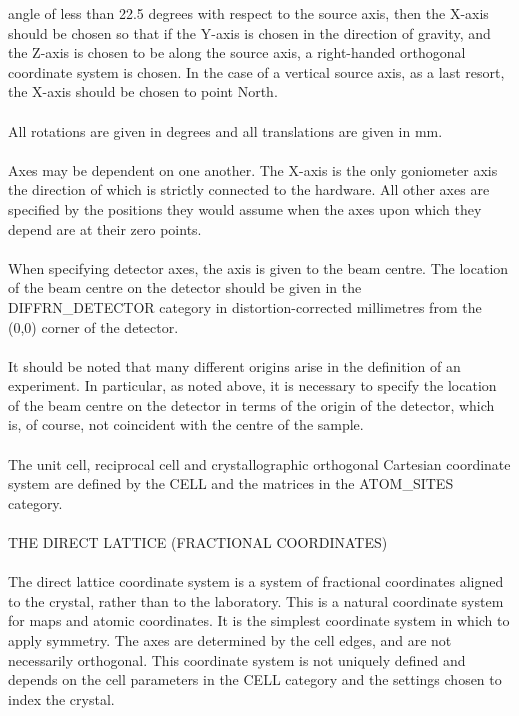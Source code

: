\documentclass[11pt]{article}
\begin{document}
{angle of less than 22.5 degrees with respect to the source axis, then 
the X-axis should be chosen so that if the Y-axis is chosen
in the direction of gravity, and the Z-axis is chosen to be along
the source axis, a right-handed orthogonal coordinate system is chosen. 
In the case of a vertical source axis, as a last resort, the
X-axis should be chosen to point North.\\
~~\\
All rotations are given in degrees and all translations are given in mm.\\
~~\\
Axes may be dependent on one another.  The X-axis is the only goniometer
axis the direction of which is strictly connected to the hardware.  All
other axes are specified by the positions they would assume when the
axes upon which they depend are at their zero points.\\
~~\\
When specifying detector axes, the axis is given to the beam centre.
The location of the beam centre on the detector should be given in the
DIFFRN\_DETECTOR category in distortion-corrected millimetres from
the (0,0) corner of the detector.\\
~~\\
It should be noted that many different origins arise in the definition
of an experiment.  In particular, as noted above, it is necessary to
specify the location of the beam centre on the detector in terms
of the origin of the detector, which is, of course, not coincident
with the centre of the sample.\\
~~\\
The unit cell, reciprocal cell and crystallographic orthogonal
Cartesian coordinate system are defined by the CELL and the matrices
in the ATOM\_SITES category.\\
~~\\
THE DIRECT LATTICE (FRACTIONAL COORDINATES)\\
~~\\
The direct lattice coordinate system is a system of fractional
coordinates aligned to the crystal, rather than to the laboratory.
This is a natural coordinate system for maps and atomic coordinates.
It is the simplest coordinate system in which to apply symmetry.
The axes are determined by the cell edges, and are not necessarily
orthogonal.  This coordinate system is not uniquely defined and
depends on the cell parameters in the CELL category and the
settings chosen to index the crystal.\\
}
\end{document}
